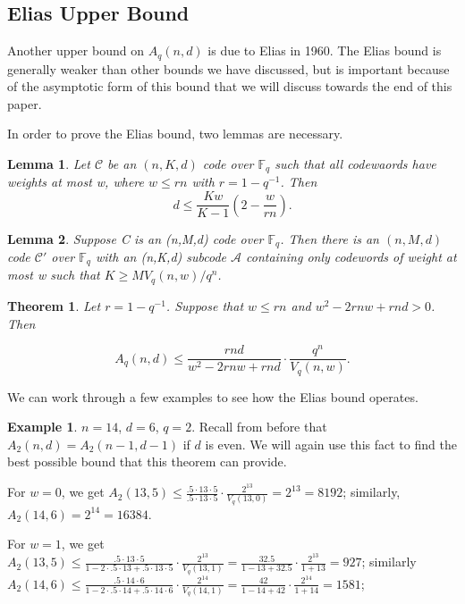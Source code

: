 \documentclass{article}
\newtheorem{theorem}{Theorem}
\numberwithin{theorem}{subsection}
\newtheorem{lemma}{Lemma}
\numberwithin{lemma}{subsection}
\theoremstyle{definition}
\newtheorem{exmp}{Example}
\numberwithin{exmp}{subsection}
\theoremstyle{definition}
\numberwithin{defn}{subsection}
\theoremstyle{definition}
\numberwithin{claim}{subsection}
\begin{document}
\subsection{Elias Upper Bound}

Another upper bound on $A_q(n,d)$ is due to Elias in 1960.  The Elias bound is generally weaker than other bounds we have discussed, but is important because of the asymptotic
form of this bound that we will discuss towards the end of this paper.  

In order to prove the Elias bound, two lemmas are necessary.

\begin{lemma}
Let $\mathcal{C}$ be an $(n,K,d)$ code over $\mathbb{F}_q$ such that all codewaords have weights at most w, where $w \le rn$ with $r=1-q^{-1}$.  Then
\begin{equation}
d\le \frac{Kw}{K-1}\left(2- \frac{w}{rn}\right).
\end{equation}
\end{lemma}

\begin{lemma}
Suppose C is an (n,M,d) code over $\mathbb{F}_q$.  Then there is an $(n,M,d)$ code $\mathcal{C}'$ over $\mathbb{F}_q$ with an (n,K,d) subcode $\mathcal{A}$ containing
only codewords of weight at most w such that $K \ge M V_q(n,w) / q^n$.
\end{lemma}

\begin{theorem}
Let $r=  1-q^{-1}$.  Suppose that $w\le rn$ and $w^2 - 2rnw + rnd > 0$.  Then

\begin{equation}
A_q(n,d) \le \frac{rnd}{w^2 - 2rnw + rnd}\cdot \frac{q^n}{V_q(n,w)}.
\end{equation}
\end{theorem}

We can work through a few examples to see how the Elias bound operates.

\begin{exmp}
$n=14$, $d=6$, $q=2$. 
Recall from before that $A_2(n,d)=A_2(n-1,d-1)$ if $d$ is even.  We will again use this fact to find the best possible bound that this theorem can provide. 

 For $w=0$, 
we get $A_2(13,5)\le \frac{.5\cdot13\cdot5}{.5\cdot13\cdot5}\cdot\frac{2^{13}}{V_q(13,0)} = 2^{13} = 8192$; similarly, $A_2(14,6) = 2^{14} = 16384$.

 For $w=1$, 
we get $A_2(13,5)\le \frac{.5\cdot13\cdot5}{1 - 2\cdot.5\cdot13 + .5\cdot13\cdot5}\cdot\frac{2^{13}}{V_q(13,1)} = \frac{32.5}{1-13+32.5}\cdot\frac{2^{13}}{1+13} = 927$;
similarly $A_2(14,6)\le \frac{.5\cdot14\cdot6}{1 - 2\cdot.5\cdot14 + .5\cdot14\cdot6}\cdot\frac{2^{14}}{V_q(14,1)} = \frac{42}{1-14+42}\cdot\frac{2^{14}}{1+14} = 1581$;


\end{exmp}
\end{document}
